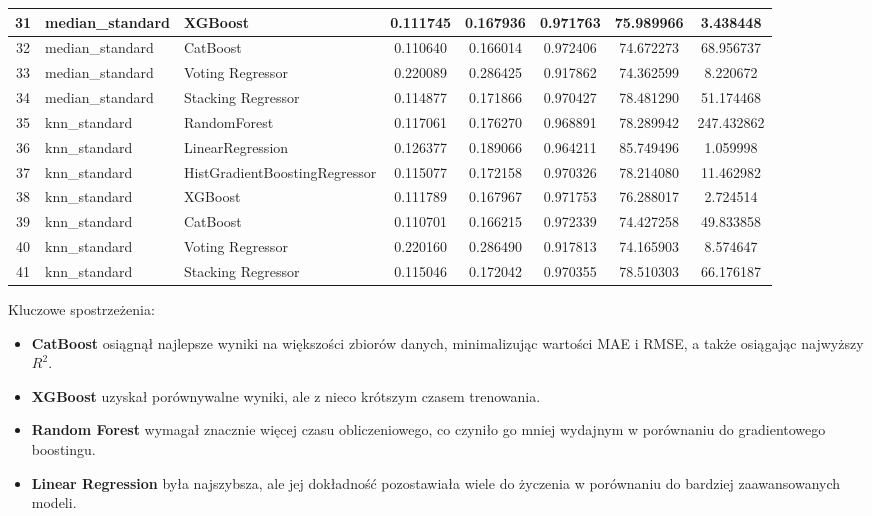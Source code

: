 \documentclass[10pt,letterpaper]{article}
\begin{document}
\begin{table}[H]
\begin{tabular}{|c|l|l|c|c|c|c|c|}
	31 & median\_standard & XGBoost & 0.111745 & 0.167936 & 0.971763 & 75.989966 & 3.438448 \\ \hline
	32 & median\_standard & CatBoost & 0.110640 & 0.166014 & 0.972406 & 74.672273 & 68.956737 \\ \hline
	33 & median\_standard & Voting Regressor & 0.220089 & 0.286425 & 0.917862 & 74.362599 & 8.220672 \\ \hline
	34 & median\_standard & Stacking Regressor & 0.114877 & 0.171866 & 0.970427 & 78.481290 & 51.174468 \\ \hline
	35 & knn\_standard & RandomForest & 0.117061 & 0.176270 & 0.968891 & 78.289942 & 247.432862 \\ \hline
	36 & knn\_standard & LinearRegression & 0.126377 & 0.189066 & 0.964211 & 85.749496 & 1.059998 \\ \hline
	37 & knn\_standard & HistGradientBoostingRegressor & 0.115077 & 0.172158 & 0.970326 & 78.214080 & 11.462982 \\ \hline
	38 & knn\_standard & XGBoost & 0.111789 & 0.167967 & 0.971753 & 76.288017 & 2.724514 \\ \hline
	39 & knn\_standard & CatBoost & 0.110701 & 0.166215 & 0.972339 & 74.427258 & 49.833858 \\ \hline
	40 & knn\_standard & Voting Regressor & 0.220160 & 0.286490 & 0.917813 & 74.165903 & 8.574647 \\ \hline
	41 & knn\_standard & Stacking Regressor & 0.115046 & 0.172042 & 0.970355 & 78.510303 & 66.176187 \\ \hline
\end{tabular}
\end{table}

\newpage
Kluczowe spostrzeżenia:
\begin{itemize}
	\item \textbf{CatBoost} osiągnął najlepsze wyniki na większości zbiorów danych, minimalizując wartości MAE i RMSE, a także osiągając najwyższy \(R^2\).
	\item \textbf{XGBoost} uzyskał porównywalne wyniki, ale z nieco krótszym czasem trenowania.
	\item \textbf{Random Forest} wymagał znacznie więcej czasu obliczeniowego, co czyniło go mniej wydajnym w porównaniu do gradientowego boostingu.
	\item \textbf{Linear Regression} była najszybsza, ale jej dokładność pozostawiała wiele do życzenia w porównaniu do bardziej zaawansowanych modeli.
\end{itemize}
\end{document}
